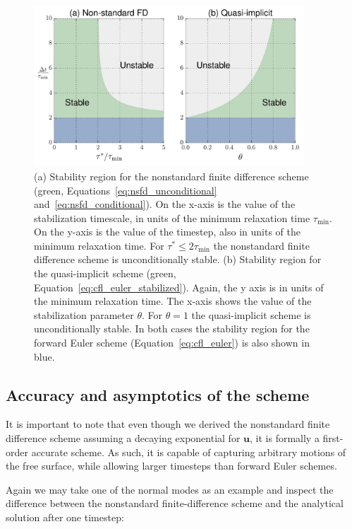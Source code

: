 \documentclass[preprint,12pt,authoryear]{elsarticle}
\begin{document}
\begin{figure}
\includegraphics[width=0.9\textwidth]{figures/stability_region.pdf}
\caption{(a) Stability region for the nonstandard finite difference scheme (green, Equations~\eqref{eq:nsfd_unconditional} and~\eqref{eq:nsfd_conditional}). On the x-axis is the value of the stabilization timescale, in units of the minimum relaxation time $\tau_{\mathrm{min}}$.  On the y-axis is the value of the timestep, also in units of the minimum relaxation time. For $\tau^*\le 2 \tau_{\mathrm{min}}$ the nonstandard finite difference scheme is unconditionally stable.  (b) Stability region for the quasi-implicit scheme (green, Equation~\eqref{eq:cfl_euler_stabilized}).  Again, the y axis is in units of the minimum relaxation time.  The x-axis shows the value of the stabilization parameter $\theta$. For $\theta = 1$ the quasi-implicit scheme is unconditionally stable. In both cases the stability region for the forward Euler scheme (Equation~\eqref{eq:cfl_euler}) is also shown in blue.}
\label{fig:stability_region}
\end{figure}

\subsection{Accuracy and asymptotics of the scheme}
It is important to note that even though we derived the nonstandard finite difference scheme assuming a decaying exponential
for $\mathbf{u}$, it is formally a first-order accurate scheme. As such, it is capable of capturing arbitrary motions 
of the free surface, while allowing larger timesteps than forward Euler schemes.

Again we may take one of the normal modes as an example and inspect the difference between the nonstandard finite-difference
scheme and the analytical solution after one timestep:
\end{document}
